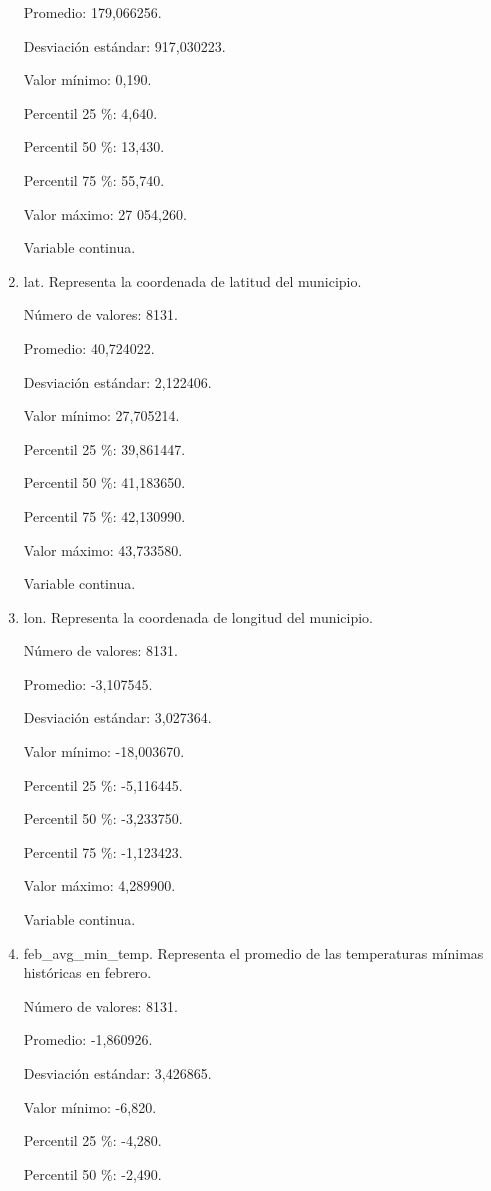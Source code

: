 \begin{enumerate}
	Promedio: 179,066256.
	
	Desviación estándar: 917,030223.
	
	Valor mínimo: 0,190.
	
	Percentil 25 \%: 4,640.
	
	Percentil 50 \%: 13,430.
	
	Percentil 75 \%: 55,740.
	
	Valor máximo: 27 054,260.
	
	Variable continua.

	\item lat. Representa la coordenada de latitud del municipio.
	
	Número de valores: 8131.
	
	Promedio: 40,724022.
	
	Desviación estándar: 2,122406.
	
	Valor mínimo: 27,705214.
	
	Percentil 25 \%: 39,861447.
	
	Percentil 50 \%: 41,183650.
	
	Percentil 75 \%: 42,130990.
	
	Valor máximo: 43,733580.
	
	Variable continua.

	\item lon. Representa la coordenada de longitud del municipio.
	
	Número de valores: 8131.
	
	Promedio: -3,107545.
	
	Desviación estándar: 3,027364.
	
	Valor mínimo: -18,003670.
	
	Percentil 25 \%: -5,116445.
	
	Percentil 50 \%: -3,233750.
	
	Percentil 75 \%: -1,123423.
	
	Valor máximo: 4,289900.
	
	Variable continua.

	\item feb\_avg\_min\_temp. Representa el promedio de las temperaturas mínimas históricas en febrero.
	
	Número de valores: 8131.
	
	Promedio: -1,860926.
	
	Desviación estándar: 3,426865.
	
	Valor mínimo: -6,820.
	
	Percentil 25 \%: -4,280.
	
	Percentil 50 \%: -2,490.
	

\end{enumerate}
